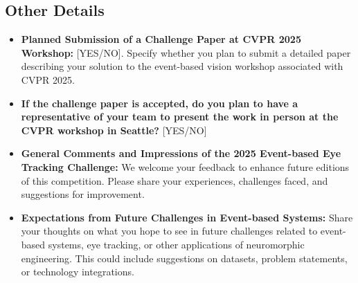 \documentclass{article}
\begin{document}
\subsection{Other Details}
\begin{itemize}
    \item \textbf{Planned Submission of a Challenge Paper at CVPR 2025 Workshop:} [YES/NO]. Specify whether you plan to submit a detailed paper describing your solution to the event-based vision workshop associated with CVPR 2025.

    \item \textbf{If the challenge paper is accepted, do you plan to have a representative of your team to present the work in person at the CVPR workshop in Seattle?} [YES/NO]
    
    \item \textbf{General Comments and Impressions of the 2025 Event-based Eye Tracking Challenge:} We welcome your feedback to enhance future editions of this competition. Please share your experiences, challenges faced, and suggestions for improvement.
    
    \item \textbf{Expectations from Future Challenges in Event-based Systems:} Share your thoughts on what you hope to see in future challenges related to event-based systems, eye tracking, or other applications of neuromorphic engineering. This could include suggestions on datasets, problem statements, or technology integrations.
\end{itemize}
\end{document}
